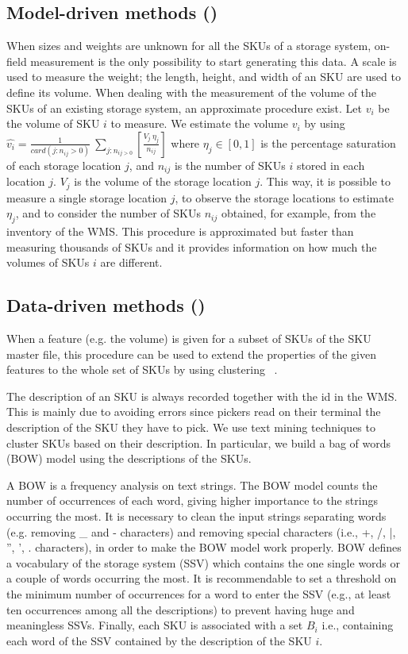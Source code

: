 \subsection{Model-driven methods ()}
When sizes and weights are unknown for all the SKUs of a storage system, on-field measurement is the only possibility to start generating this data. A scale is used to measure the weight; the length, height, and width of an SKU are used to define its volume. When dealing with the measurement of the volume of the SKUs of an existing storage system, an approximate procedure exist. Let $v_i$ be the volume of SKU $i$ to measure. We estimate the volume $v_i$ by using  $\widehat{v_i}=\frac{1}{card(j:n_{ij}>0)}\ \sum_{j:n_{ij>0}}\left[\frac{V_j\ \eta_j}{n_{ij}}\right]$ where  $\eta_j\in[0,1]$ is the percentage saturation of each storage location $j$, and $n_{ij}$ is the number of SKUs $i$ stored in each location $j$. $V_j$ is the volume of the storage location $j$. This way, it is possible to measure a single storage location $j$, to observe the storage locations to estimate $\eta_j$, and to consider the number of SKUs $n_{ij}$ obtained, for example, from the inventory of the WMS. This procedure is approximated but faster than measuring thousands of SKUs and it provides information on how much the volumes of SKUs $i$ are different.

\subsection{Data-driven methods ()}
When a feature (e.g. the volume) is given for a subset of SKUs of the SKU master file, this procedure can be used to extend the properties of the given features to the whole set of SKUs by using clustering ~\cite{Tufano2019}.\par

The description of an SKU is always recorded together with the id in the WMS. This is mainly due to avoiding errors since pickers read on their terminal the description of the SKU they have to pick. We use text mining techniques to cluster SKUs based on their description. In particular, we build a bag of words (BOW) model using the descriptions of the SKUs.\par

A BOW is a frequency analysis on text strings. The BOW model counts the number of occurrences of each word, giving higher importance to the strings occurring the most. It is necessary to clean the input strings separating words (e.g. removing \_ and - characters) and removing special characters (i.e., +, /, |, ”,  ’, . characters), in order to make the BOW model work properly. BOW defines a vocabulary of the storage system (SSV) which contains the one single words or a couple of words occurring the most. It is recommendable to set a threshold on the minimum number of occurrences for a word to enter the SSV (e.g., at least ten occurrences among all the descriptions) to prevent having huge and meaningless SSVs. Finally, each SKU is associated with a set $B_i$ i.e., containing each word of the SSV contained by the description of the SKU $i$.\par

